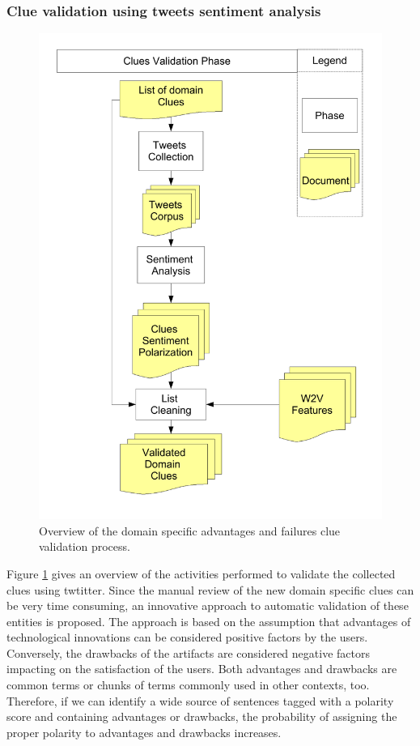 \documentclass[]{book}
\theoremstyle{definition}
\theoremstyle{definition}
\theoremstyle{definition}
\theoremstyle{remark}
\begin{document}
\subsubsection*{Clue validation using tweets sentiment
analysis}\label{clue-validation-using-tweets-sentiment-analysis}

\begin{figure}

{\centering \includegraphics[width=0.8\linewidth]{_bookdown_files/figures/pointer-validation-phase} 

}

\caption{Overview of the domain specific advantages and failures clue validation process.}\label{fig:advdrwarticleprocessfigcluevalidationphase}
\end{figure}

Figure \ref{fig:advdrwarticleprocessfigcluevalidationphase} gives an
overview of the activities performed to validate the collected clues
using twtitter. Since the manual review of the new domain specific clues
can be very time consuming, an innovative approach to automatic
validation of these entities is proposed. The approach is based on the
assumption that advantages of technological innovations can be
considered positive factors by the users. Conversely, the drawbacks of
the artifacts are considered negative factors impacting on the
satisfaction of the users. Both advantages and drawbacks are common
terms or chunks of terms commonly used in other contexts, too.
Therefore, if we can identify a wide source of sentences tagged with a
polarity score and containing advantages or drawbacks, the probability
of assigning the proper polarity to advantages and drawbacks increases.
\end{document}
